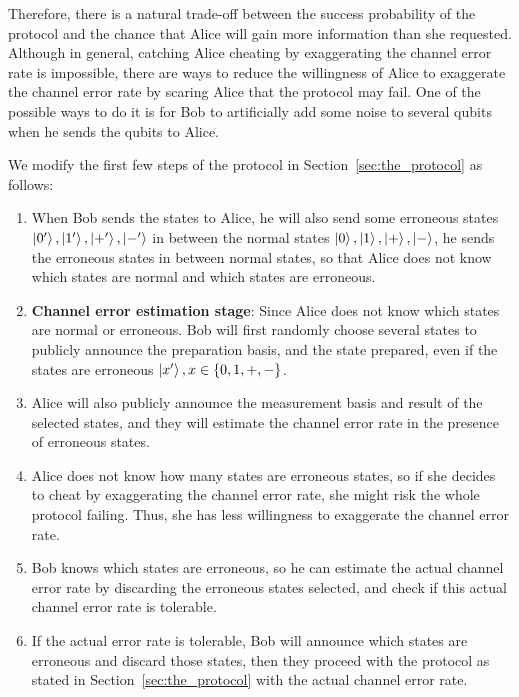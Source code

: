 \documentclass[%
 reprint,
superscriptaddress,
 amsmath,amssymb,
 aps,
]{revtex4-2}
\begin{document}
Therefore, there is a natural trade-off between the success probability of the protocol and the chance that Alice will gain more information than she requested. Although in general, catching Alice cheating by exaggerating the channel error rate is impossible, there are ways to reduce the willingness of Alice to exaggerate the channel error rate by scaring Alice that the protocol may fail. One of the possible ways to do it is for Bob to artificially add some noise to several qubits when he sends the qubits to Alice.

We modify the first few steps of the protocol in Section~\ref{sec:the_protocol} as follows: 
\begin{enumerate}
    \item When Bob sends the states to Alice, he will also send some erroneous states $\ket{0'}, \ket{1'}, \ket{+'}, \ket{-'} $ in between the normal states $\ket{0}, \ket{1}, \ket{+}, \ket{-}$, he sends the erroneous states in between normal states, so that Alice does not know which states are normal and which states are erroneous.
    
    \item \textbf{Channel error estimation stage}: Since Alice does not know which states are normal or erroneous. Bob will first randomly choose several states to publicly announce the preparation basis, and the state prepared, even if the states are erroneous $\ket{x'}, x\in\{0, 1, +, -\}$.

    \item Alice will also publicly announce the measurement basis and result of the selected states, and they will estimate the channel error rate in the presence of erroneous states.

    \item Alice does not know how many states are erroneous states, so if she decides to cheat by exaggerating the channel error rate, she might risk the whole protocol failing. Thus, she has less willingness to exaggerate the channel error rate.

    \item Bob knows which states are erroneous, so he can estimate the actual channel error rate by discarding the erroneous states selected, and check if this actual channel error rate is tolerable.

    \item If the actual error rate is tolerable, Bob will announce which states are erroneous and discard those states, then they proceed with the protocol as stated in Section~\ref{sec:the_protocol} with the actual channel error rate.
\end{enumerate}
\end{document}
